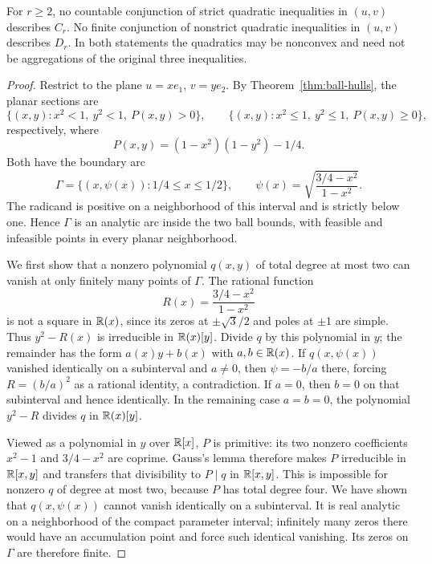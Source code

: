 \begin{theorem}\label{thm:no-finite-quadratics}
For $r\geq2$, no countable conjunction of strict quadratic inequalities
in $(u,v)$ describes $C_r$. No finite conjunction of nonstrict
quadratic inequalities in $(u,v)$ describes $D_r$. In both
statements the quadratics may be nonconvex and need not be
aggregations of the original three inequalities.
\end{theorem}
\begin{proof}
Restrict to the plane $u=xe_1$, $v=ye_2$. By
Theorem~\ref{thm:ball-hulls}, the planar sections are
\[
 \{(x,y):x^2<1,\ y^2<1,\ P(x,y)>0\},\qquad
 \{(x,y):x^2\leq1,\ y^2\leq1,\ P(x,y)\geq0\},
\]
respectively, where
\begin{equation}\label{eq:quartic-boundary}
 P(x,y)=(1-x^2)(1-y^2)-1/4.
\end{equation}
Both have the boundary arc
\[
 \Gamma=\{(x,\psi(x)):1/4\leq x\leq1/2\},\qquad
 \psi(x)=\sqrt{\frac{3/4-x^2}{1-x^2}}.
\]
The radicand is positive on a neighborhood of this interval and
is strictly below one. Hence $\Gamma$ is an analytic arc inside
the two ball bounds, with feasible and infeasible points in every
planar neighborhood.

We first show that a nonzero polynomial $q(x,y)$ of total degree
at most two can vanish at only finitely many points of $\Gamma$.
The rational function
\[
 R(x)=\frac{3/4-x^2}{1-x^2}
\]
is not a square in $\mathbb R(x)$, since its zeros at
$\pm\sqrt3/2$ and poles at $\pm1$ are simple. Thus
$y^2-R(x)$ is irreducible in $\mathbb R(x)[y]$. Divide $q$ by this
polynomial in $y$; the remainder has the form $a(x)y+b(x)$
with $a,b\in\mathbb R(x)$. If $q(x,\psi(x))$ vanished identically
on a subinterval and $a\ne0$, then
$\psi=-b/a$ there, forcing $R=(b/a)^2$ as a rational identity,
a contradiction. If $a=0$, then $b=0$ on that subinterval
and hence identically. In the remaining case $a=b=0$, the
polynomial $y^2-R$ divides $q$ in $\mathbb R(x)[y]$.

Viewed as a polynomial in $y$ over $\mathbb R[x]$, $P$ is primitive:
its two nonzero coefficients $x^2-1$ and $3/4-x^2$ are
coprime. Gauss's lemma therefore makes $P$ irreducible in
$\mathbb R[x,y]$ and transfers that divisibility to $P\mid q$ in
$\mathbb R[x,y]$. This is impossible for nonzero $q$ of degree at
most two, because $P$ has total degree four. We have shown
that $q(x,\psi(x))$ cannot vanish identically on a subinterval.
It is real analytic on a neighborhood of the compact parameter
interval; infinitely many zeros there would have an accumulation
point and force such identical vanishing. Its zeros on
$\Gamma$ are therefore finite.


\end{proof}
